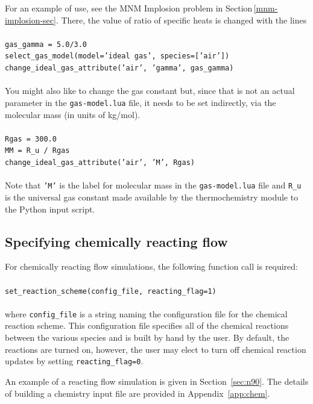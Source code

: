 \medskip
For an example of use, see the MNM Implosion problem in Section\,\ref{mnm-implosion-sec}.
There, the value of ratio of specific heats is changed with the lines\\
%
\topbar\\
\texttt{gas\_gamma = 5.0/3.0}\\
\texttt{select\_gas\_model(model='ideal gas', species=['air'])}\\
\texttt{change\_ideal\_gas\_attribute('air', 'gamma', gas\_gamma)\\}
\bottombar\\
You might also like to change the gas constant but, since that is not an actual parameter in the 
\texttt{gas-model.lua} file, it needs to be set indirectly, via the molecular mass (in units of kg/mol).\\
\topbar\\
\texttt{Rgas = 300.0}\\
\texttt{MM = R\_u / Rgas}\\
\texttt{change\_ideal\_gas\_attribute('air', 'M', Rgas)\\}
\bottombar\\
Note that \texttt{'M'} is the label for molecular mass in the \texttt{gas-model.lua} file
and \texttt{R\_u} is the universal gas constant made available by the thermochemistry module
to the Python input script.


\subsection{Specifying chemically reacting flow}
For chemically reacting flow simulations, the following function call is
required:\\
%
\topbar\\
\texttt{set\_reaction\_scheme(config\_file, reacting\_flag=1)}\\
\bottombar\\
where \texttt{config\_file} is a string naming the configuration file for the
chemical reaction scheme.  This configuration file specifies all of the chemical
reactions between the various species and is built by hand by the user.
By default, the reactions are turned on, however, the user may elect to turn off
chemical reaction updates by setting \texttt{reacting\_flag=0}.

\medskip
An example of a reacting flow simulation is given in Section~\ref{sec:n90}.
The details of building a chemistry input file are provided in Appendix~\ref{app:chem}.

